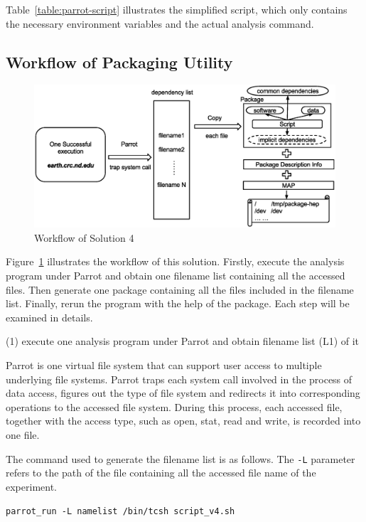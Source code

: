 \documentclass{acm_proc_article-sp}
\begin{document}
Table~\ref{table:parrot-script} illustrates
the simplified script, which
only contains the necessary environment variables and the
actual analysis command.

\subsection{Workflow of Packaging Utility}
\begin{figure}
\centering
\includegraphics[width=1.6\columnwidth]{workflow-parrot.eps}
\caption{Workflow of Solution 4}
\label{fig:workflow-parrot}
\end{figure}

Figure~\ref{fig:workflow-parrot} illustrates the workflow of this solution. Firstly, execute the analysis program under Parrot and obtain one filename list containing all the accessed files. Then generate one package containing all the files included in the filename list. Finally, rerun the program with the help of the package. Each step will be examined in details.

(1) execute one analysis program under Parrot and obtain filename list (L1) of it

Parrot is one virtual file system that can support user access to multiple
underlying file systems. Parrot traps each system call involved in the process
of data access, figures out the type of file system and redirects it into
corresponding operations to the accessed file system. During this process, each
accessed file, together with the access type, such as
open, stat, read and write, is recorded into one file.

The command used to generate the filename list is as follows. The {\tt -L} parameter refers to the path of the file containing all the accessed file name of the experiment.

{\tt parrot\_run -L namelist /bin/tcsh script\_v4.sh}
\end{document}
